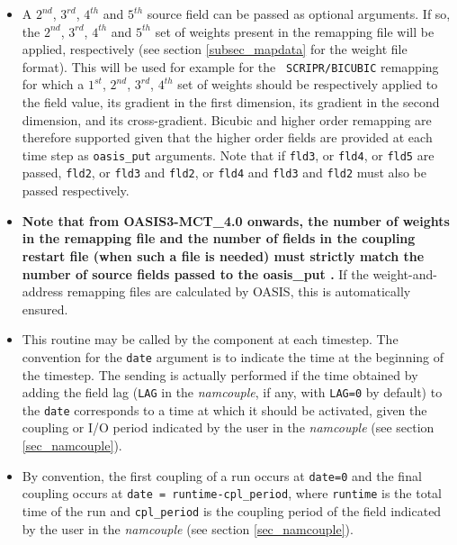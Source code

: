 \begin{itemize}

\item A $2^{nd}$, $3^{rd}$, $4^{th}$ and $5^{th}$ source field can be
  passed as optional arguments. If so, the $2^{nd}$, $3^{rd}$,
  $4^{th}$ and $5^{th}$ set of weights present in the remapping file
  will be applied, respectively (see section \ref{subsec_mapdata} for
  the weight file format). This will be used for example for the {\tt
    SCRIPR/BICUBIC} remapping for which a $1^{st}$, $2^{nd}$,
  $3^{rd}$, $4^{th}$ set of weights should be respectively applied to
  the field value, its gradient in the first dimension, its gradient
  in the second dimension, and its cross-gradient. Bicubic and higher order
  remapping are therefore supported given that the higher order fields
  are provided at each time step as {\tt oasis\_put} arguments. Note
  that if {\tt fld3}, or {\tt fld4}, or {\tt fld5} are passed, {\tt fld2}, or {\tt fld3} and 
  {\tt fld2}, or {\tt fld4} and {\tt fld3} and {\tt fld2} must also be passed respectively.
\item {\bf Note that from OASIS3-MCT\_4.0 onwards, 
the number of weights in the remapping file and the number of fields in the coupling restart file 
(when such a file is needed) must strictly match the number of source fields passed to the 
oasis\_put .} If the weight-and-address remapping files are calculated by OASIS, this
is automatically ensured.


\item This routine may be called by the component at each timestep. The
  convention for the {\tt date} argument is to indicate the time at
  the beginning of the timestep. The sending is actually performed
  if the time obtained by adding the field lag ({\tt LAG} in the
  {\em namcouple}, if any, with {\tt LAG=0} by default) to the {\tt date} corresponds to a time at which it
  should be activated, given the coupling or I/O period indicated by
  the user in the {\it namcouple} (see section \ref{sec_namcouple}).

\item By convention, the first coupling
  of a run occurs at {\tt date=0} and the final coupling occurs
  at {\tt date = runtime-cpl\_period}, where {\tt runtime} is the total time of
  the run and {\tt cpl\_period} is the coupling period of the field indicated by
  the user in the {\it namcouple} (see section \ref{sec_namcouple}).


\end{itemize}
